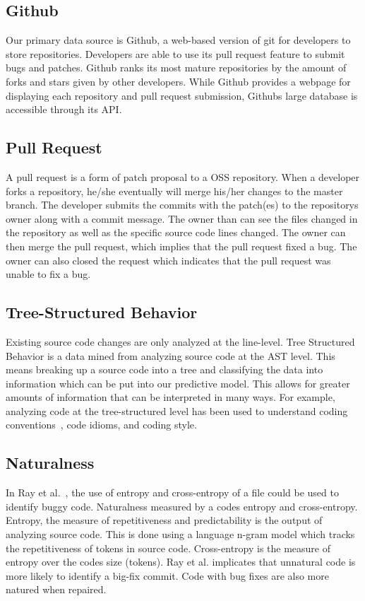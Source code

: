 \documentclass[10pt, conference]{IEEEtran}
\begin{document}
\subsection{Github}
Our primary data source is Github, a web-based version of git for developers to store repositories. Developers are able to use its pull request feature to submit bugs and patches. Github ranks its most mature repositories by the amount of forks and stars given by other developers. While Github provides a webpage for displaying each repository and pull request submission, Github\textquotesingle s large database is accessible through its API. 

\subsection{Pull Request}
A pull request is a form of patch proposal to a OSS repository. When a developer forks a repository, he/she eventually will merge his/her changes to the master branch. The developer submits the commits with the patch(es) to the repository\textquotesingle s owner along with a commit message. The owner than can see the files changed in the repository as well as the specific source code lines changed. The owner can then merge the pull request, which implies that the pull request fixed a bug. The owner can also closed the request which indicates that the pull request was unable to fix a bug.

\subsection{Tree-Structured Behavior}
Existing source code changes are only analyzed at the line-level. Tree Structured Behavior is a data mined from analyzing source code at the AST level. This means breaking up a source code into a tree and classifying the data into information which can be put into our predictive model. This allows for greater amounts of information that can be interpreted in many ways. For example, analyzing code at the tree-structured level has been used to understand coding conventions~\cite{Allamanis:2014:LNC:2635868.2635883}, code idioms, and coding style.

\subsection{Naturalness}
In Ray et al.~\cite{Ray:2016:NBC:2884781.2884848}, the use of entropy and cross-entropy of a file could be used to identify buggy code. Naturalness measured by a code\textquotesingle s entropy and cross-entropy. Entropy, the measure of repetitiveness and predictability is the output of analyzing source code. This is done using a language n-gram model which tracks the repetitiveness of tokens in source code. Cross-entropy is the measure of entropy over the code\textquotesingle s size (tokens). Ray et al. implicates that unnatural code is more likely to identify a big-fix commit.  Code with bug fixes are also more natured when repaired. 
\end{document}

